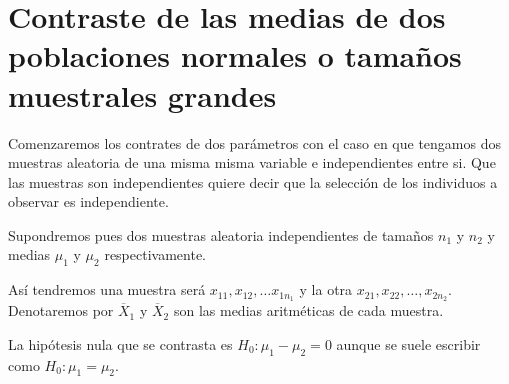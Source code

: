 \documentclass[12pt]{report}
\begin{document}

%    

%    
%    
%     
\section{Contraste de las  medias de dos poblaciones normales o tamaños muestrales grandes}

\newcommand{\pp}[1]{p\left\{#1\right\}}
\renewcommand{\thecas}{\Roman{cas}}
\newcommand{\posacas}{\addtocounter{cas}{1}{\bf \thecas}}


Comenzaremos los contrates de dos parámetros con el caso en que tengamos dos muestras aleatoria de una misma misma variable e independientes entre si. Que las muestras son independientes quiere decir que la selección de los individuos a observar es independiente.

Supondremos pues dos muestras aleatoria independientes de tamaños $n_1$ y $n_2$ y medias $\mu_1$ y $\mu_2$  respectivamente.

Así tendremos una muestra será $x_{1 1}, x_{1 2},\ldots x_{1 n_1}$ y  la otra $x_{2 1}, x_{2 2},\ldots, x_{2 n_2}$.
Denotaremos por $\overline{X}_1$ y $\overline{X}_2$ son las medias aritméticas de cada muestra.

La hipótesis nula que se contrasta es $H_0: \mu_1-\mu_2=0$ aunque se suele escribir como $H_0: \mu_1=\mu_2$. 
\end{document}
